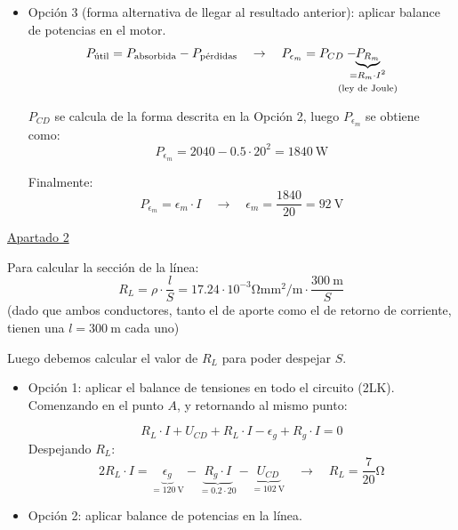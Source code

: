 \begin{example}
\begin{itemize}
  \item Opción 3 (forma alternativa de llegar al resultado anterior):
    aplicar balance de potencias en el motor.
    \[
      P_{\textrm{útil}} = P_{\textrm{absorbida}} -
      P_{\textrm{pérdidas}} \quad \rightarrow \quad P_{\epsilon_m} =
      P_{CD} - \hspace{-6mm} \underbrace{P_{R_m}}_{\substack{= R_m
          \cdot I^2 \\[3pt] \text{(ley de Joule)}}}
    \]
    
    $P_{CD}$ se calcula de la forma descrita en la Opción 2, luego
    $P_{\epsilon_m}$ se obtiene como:
    \[
      P_{\epsilon_m} = 2040 - 0.5 \cdot 20^2 = \qty{1840}{\watt}
    \]

    Finalmente:
    \[
      P_{\epsilon_m} = \epsilon_m \cdot I \quad \rightarrow \quad
      \epsilon_m = \frac{1840}{20} = \boxed{ \qty{92}{\volt} }
    \]
  \end{itemize}

  \vspace{3mm}

  \underline{Apartado 2}

  \vspace{5mm}

  Para calcular la sección de la línea:
  \[
    R_L = \rho \cdot \frac{l}{S} = {17.24 \cdot
      10^{-3}}\si{\ohm\milli\meter\squared\per\meter} \cdot
    \frac{\qty{300}{\meter}}{S}
  \]
  (dado que ambos conductores, tanto el de aporte como el de retorno
  de corriente, tienen una $l=\qty{300}{\meter}$ cada uno)

  \vspace{3mm} Luego debemos calcular el valor de $R_L$ para poder
  despejar $S$.
  \begin{itemize}
  \item Opción 1: aplicar el balance de tensiones en todo el circuito
    (2LK). Comenzando en el punto $A$, y retornando al mismo punto:
    
    \[
      R_L \cdot I + U_{CD} + R_L \cdot I - \epsilon_g + R_g \cdot I =
      0
    \]
    Despejando $R_L$:
    \[
      2 R_L \cdot I = \underbrace{\epsilon_g}_{=\qty{120}{\volt}} -
      \underbrace{R_g \cdot I}_{=0.2 \cdot 20} -
      \underbrace{U_{CD}}_{=\qty{102}{\volt}} \quad \rightarrow \quad
      \boxed{ R_L = {\frac{7}{20}}\si{\ohm} }
    \]

  \item Opción 2: aplicar balance de potencias en la línea.


\end{itemize}
\end{example}
